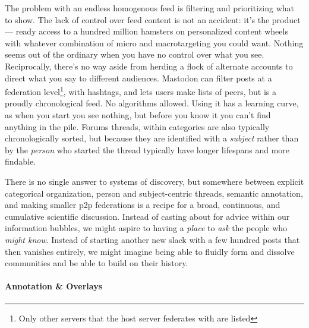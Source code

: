 \documentclass[10pt]{article}
\begin{document}
\begin{multicols}{2}
The problem with an endless homogenous feed is filtering and
prioritizing what to show. The lack of control over feed content is not
an accident: it's the product --- ready access to a hundred million
hamsters on personalized content wheels with whatever combination of
micro and macrotargeting you could want. Nothing seems out of the
ordinary when you have no control over what you see. Reciprocally,
there's no way aside from herding a flock of alternate accounts to
direct what you say to different audiences. Mastodon can filter posts at
a federation level\footnote{Only other servers that the host server
  federates with are listed}, with hashtags, and lets users make lists
of peers, but is a proudly chronological feed. No algorithms allowed.
Using it has a learning curve, as when you start you see nothing, but
before you know it you can't find anything in the pile. Forums threads,
within categories are also typically chronologically sorted, but because
they are identified with a \emph{subject} rather than by the
\emph{person} who started the thread typically have longer lifespans and
more findable.

There is no single answer to systems of discovery, but somewhere between
explicit categorical organization, person and subject-centric threads,
semantic annotation, and making smaller p2p federations is a recipe for
a broad, continuous, and cumulative scientific discussion. Instead of
casting about for advice within our information bubbles, we might aspire
to having a \emph{place} to \emph{ask} the people who \emph{might know}.
Instead of starting another new slack with a few hundred posts that then
vanishes entirely, we might imagine being able to fluidly form and
dissolve communities and be able to build on their history.

\hypertarget{annotation-overlays}{%
\paragraph{Annotation \& Overlays}\label{annotation-overlays}}


\end{multicols}
\end{document}
